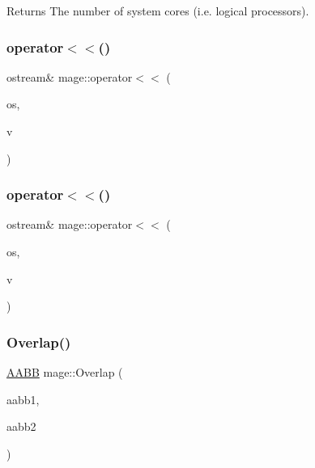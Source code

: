 \begin{DoxyReturn}{Returns}
The number of system cores (i.\+e. logical processors). 
\end{DoxyReturn}
\hypertarget{namespacemage_a44b2d3046802608544402245919f219b}{}\label{namespacemage_a44b2d3046802608544402245919f219b} 
\subsubsection{\texorpdfstring{operator$<$$<$()}{operator<<()}\hspace{0.1cm}{\footnotesize\ttfamily [1/2]}}
{\footnotesize\ttfamily ostream\& mage\+::operator$<$$<$ (\begin{DoxyParamCaption}\item[{ostream \&}]{os,  }\item[{const X\+M\+F\+L\+O\+A\+T3 \&}]{v }\end{DoxyParamCaption})}

\hypertarget{namespacemage_af6c1d1c5718d611450932bde30d2bfef}{}\label{namespacemage_af6c1d1c5718d611450932bde30d2bfef} 
\subsubsection{\texorpdfstring{operator$<$$<$()}{operator<<()}\hspace{0.1cm}{\footnotesize\ttfamily [2/2]}}
{\footnotesize\ttfamily ostream\& mage\+::operator$<$$<$ (\begin{DoxyParamCaption}\item[{ostream \&}]{os,  }\item[{const X\+M\+F\+L\+O\+A\+T4 \&}]{v }\end{DoxyParamCaption})}

\hypertarget{namespacemage_a1068090c66ff1c6398b134455730eb02}{}\label{namespacemage_a1068090c66ff1c6398b134455730eb02} 
\subsubsection{\texorpdfstring{Overlap()}{Overlap()}}
{\footnotesize\ttfamily \hyperlink{structmage_1_1_a_a_b_b}{A\+A\+BB} mage\+::\+Overlap (\begin{DoxyParamCaption}\item[{const \hyperlink{structmage_1_1_a_a_b_b}{A\+A\+BB} \&}]{aabb1,  }\item[{const \hyperlink{structmage_1_1_a_a_b_b}{A\+A\+BB} \&}]{aabb2 }\end{DoxyParamCaption})}


